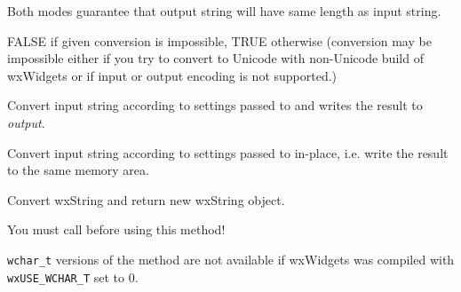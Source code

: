 \begin{twocollist}\itemsep=0pt
\end{twocollist}

Both modes guarantee that output string will have same length
as input string.


FALSE if given conversion is impossible, TRUE otherwise
(conversion may be impossible either if you try to convert
to Unicode with non-Unicode build of wxWidgets or if input
or output encoding is not supported.)

\label{wxencodingconverterconvert}





Convert input string according to settings passed to
 and writes the result to {\it output}.



Convert input string according to settings passed to
 in-place, i.e. write the result to the
same memory area.


Convert wxString and return new wxString object.


You must call  before using this method!

{\tt wchar\_t} versions of the method are not available if wxWidgets was compiled
with {\tt wxUSE\_WCHAR\_T} set to 0.

